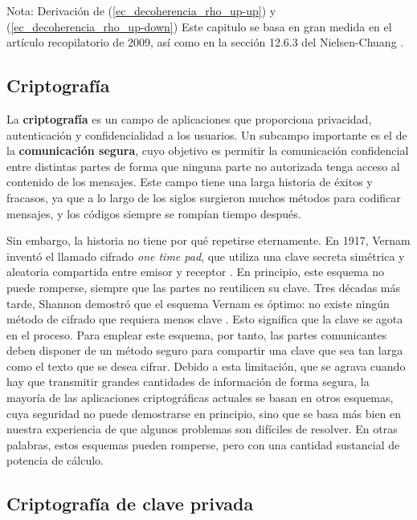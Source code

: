 \documentclass[a4paper,11pt]{book} %
\numberwithin{equation}{chapter}
\begin{document}
\begin{mybox_blue}{Nota: Derivación de (\ref{ec_decoherencia_rho_up-up}) y  (\ref{ec_decoherencia_rho_up-down})}
Este capitulo se basa en gran medida en el artículo recopilatorio \cite{QKD_resumen} de 2009, así como en la sección 12.6.3 del Nielsen-Chuang \cite{nielsen_chuang_2010}.

	\subsection{Criptografía}
	
	La \textbf{criptografía} es un campo de aplicaciones que proporciona privacidad, autenticación y confidencialidad a los usuarios. Un subcampo importante es el de la \textbf{comunicación segura}, cuyo objetivo es permitir la comunicación confidencial entre distintas partes de forma que ninguna parte no autorizada tenga acceso al contenido de los mensajes. Este campo tiene una larga historia de éxitos y fracasos, ya que a lo largo de los siglos surgieron muchos métodos para codificar mensajes, y los códigos siempre se rompían tiempo después.

Sin embargo, la historia no tiene por qué repetirse eternamente. En 1917, Vernam inventó el llamado cifrado \textit{one time pad}, que utiliza una clave secreta simétrica y aleatoria compartida entre emisor y receptor \cite{Vernam-1926}. En principio, este esquema no puede romperse, siempre que las partes no reutilicen su clave. Tres décadas más tarde, Shannon demostró que el esquema Vernam es óptimo: no existe ningún método de cifrado que requiera menos clave \cite{Shannon-1949}. Esto significa que la clave se agota en el proceso. Para emplear este esquema, por tanto, las partes comunicantes deben disponer de un método seguro para compartir una clave que sea tan larga como el texto que se desea cifrar. Debido a esta limitación, que se agrava cuando hay que transmitir grandes cantidades de información de forma segura, la mayoría de las aplicaciones criptográficas actuales se basan en otros esquemas, cuya seguridad no puede demostrarse en principio, sino que se basa más bien en nuestra experiencia de que algunos problemas son difíciles de resolver. En otras palabras, estos esquemas pueden romperse, pero con una cantidad sustancial de potencia de cálculo. 

		\subsection{Criptografía de clave privada}
	

\end{mybox_blue}
\end{document}
